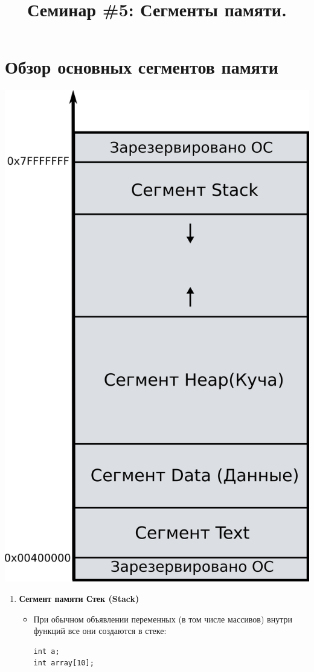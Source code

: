 \documentclass[10pt]{article}
\begin{document}
\title{Семинар \#5: Сегменты памяти.\vspace{-5ex}}\date{}\maketitle
\section*{Обзор основных сегментов памяти}
\begin{multicols}{2}
\begin{center}
\includegraphics[scale=1.1]{../images/memory_layout.png}
\end{center}
\columnbreak
\begin{enumerate}
\item \textbf{Сегмент памяти Стек (Stack)}
\begin{itemize}
\item При обычном объявлении переменных (в том числе массивов) внутри функций все они создаются в стеке: 
\begin{lstlisting}
int a; 
int array[10];
\end{lstlisting}



\end{itemize}
\end{enumerate}
\end{multicols}
\end{document}
